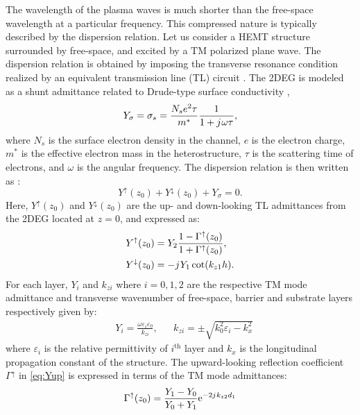 \documentclass{ieeeaccess}
\renewcommand{\O}{\omega}  %
\newcommand{\E}{\varepsilon}  %
\renewcommand{\^}{\hat}  %
\newcommand{\e}{\mathrm{e}} %
\renewcommand{\j}{{j}\mkern1mu} %
\begin{document}
The wavelength of the plasma waves is much shorter than the free-space wavelength at a particular frequency. This compressed nature is typically described by the dispersion relation. Let us consider a HEMT structure surrounded by free-space, and excited by a $\mathrm{TM}$ polarized plane wave. The dispersion relation is obtained by imposing the transverse resonance condition realized by an equivalent transmission line (TL) circuit \cite{Kastner_1988,Michalski2005}. The 2DEG is modeled as a shunt admittance related to Drude-type surface conductivity \cite{Burke2000},
%
\begin{equation}
  Y_{\sigma} = \sigma_s = \frac{N_s e^2 \tau}{m^{\ast}}\frac{1}{1 + \j \O \tau},
  \label{eq:Y2deg}
\end{equation}
%
where $N_s$ is the surface electron density in the channel, $e$ is the electron charge, $m^{\ast}$ is the effective electron mass in the heterostructure, $\tau$ is the scattering time of electrons, and $\O$ is the angular frequency. The dispersion relation is then written as \cite{Gomez-Diaz2012}:
%
\begin{equation}
  Y^{\uparrow}(z_0) + Y^{\downarrow}(z_0) + Y_{\sigma} = 0.
  \label{eq:dispersion}
\end{equation}
%
Here, $Y^{\uparrow}(z_0)$ and $Y^{\downarrow}(z_0)$ are the up- and down-looking TL admittances from the 2DEG located at $z = 0$, and expressed as:
%
\begin{subequations}
  \begin{align}
    Y^{\uparrow}(z_0) &=  Y_2 \frac{1 - \Gamma^{\uparrow}(z_0)}{1 + \Gamma^{\uparrow}(z_0)},
    \label{eq:Yup} \\
    Y^{\downarrow}(z_0) &=  -\j Y_1 \cot (k_{z1} h).
    \label{eq:Ydown}
  \end{align}
  \label{eq:Y}%
\end{subequations}
%
For each layer, $Y_{i}$ and $k_{zi}$ where $i = 0,1,2$ are the respective TM mode admittance and transverse wavenumber of free-space, barrier and substrate layers respectively given by:
%
\begin{align}
  & Y_i = \frac{\O \E_i \E_0}{k_{zi}}, && k_{zi} = \pm \sqrt{k_0^2 \E_i - k_x^2}
  \label{eq:Yandk}
\end{align}
%
where $\E_i$ is the relative permittivity of $i^{\text{th}}$ layer and $k_x$ is the longitudinal propagation constant of the structure. The upward-looking reflection coefficient $\Gamma^{\uparrow}$ in \eqref{eq:Yup} is expressed in terms of the TM mode admittances:
%
\begin{equation}
  \Gamma^{\uparrow}(z_0) = \frac{Y_1 - Y_0}{Y_0 + Y_1} \e^{-2\j k_{z2}d_1}
  \label{eq:Gamma}
\end{equation}
%
\end{document}
